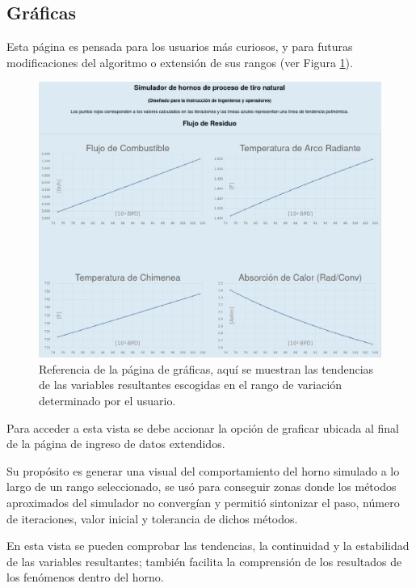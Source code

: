\subsection{Gráficas}
\par Esta página es pensada para los usuarios más curiosos, y para futuras modificaciones del algoritmo o extensión de sus rangos (ver Figura \ref{fig:graficas}).
\begin{figure}[H]\begin{center}
\includegraphics[scale=0.36]{images/graficas.png}
\caption[Página de gráficas]{Referencia de la página de gráficas, aquí se muestran las tendencias de las variables resultantes escogidas en el rango de variación determinado por el usuario.}
\label{fig:graficas} \end{center} \end{figure}
\par Para acceder a esta vista se debe accionar la opción de graficar ubicada al final de la página de ingreso de datos extendidos.
\par Su propósito es generar una visual del comportamiento del horno simulado a lo largo de un rango seleccionado, se usó para conseguir zonas donde los métodos aproximados del simulador no convergían y permitió sintonizar el paso, número de iteraciones, valor inicial y tolerancia de dichos métodos.
\par En esta vista se pueden comprobar las tendencias, la continuidad y la estabilidad de las variables resultantes; también facilita la comprensión de los resultados de los fenómenos dentro del horno.

